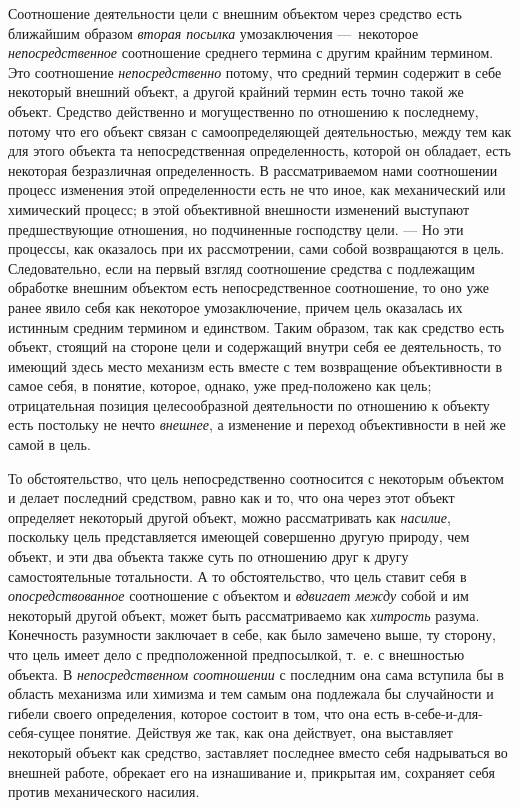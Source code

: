\documentclass[twoside]{article}
\begin{document}
{{{{Соотношение деятельности цели с внешним объектом через
средство есть ближайшим образом
{\em вторая посылка}
умозаключения —~некоторое
{\em непосредственное}
соотношение среднего термина с другим крайним термином. Это
соотношение {\em непосредственно}
потому, что средний термин содержит в себе некоторый внешний
объект, а другой крайний термин есть точно такой же объект. Средство
действенно и могущественно по отношению к последнему, потому что его объект
связан с самоопределяющей деятельностью, между тем как для этого объекта та
непосредственная определенность, которой он обладает, есть некоторая
безразличная определенность. В рассматриваемом нами соотношении процесс
изменения этой определенности есть не что иное, как механический или
химический процесс; в этой объективной внешности изменений выступают
предшествующие отношения, но подчиненные господству цели. —
Но эти процессы, как оказалось при их рассмотрении, сами
собой возвращаются в цель. Следовательно, если на первый взгляд соотношение
средства с подлежащим обработке внешним объектом есть непосредственное
соотношение, то оно уже ранее явило себя как некоторое умозаключение,
причем цель оказалась их истинным средним термином и единством. Таким
образом, так как средство есть объект, стоящий на стороне цели и содержащий
внутри себя ее деятельность, то имеющий здесь место механизм есть вместе с
тем возвращение объективности в самое себя, в понятие, которое, однако, уже
пред-положено как цель; отрицательная позиция целесообразной деятельности
по отношению к объекту есть постольку не нечто
{\em внешнее}, а
изменение и переход объективности в ней же самой в цель.

То обстоятельство, что цель непосредственно соотносится с
некоторым объектом и делает последний средством, равно как и то, что она
через этот объект определяет некоторый другой объект, можно рассматривать
как {\em насилие},
поскольку цель представляется имеющей совершенно другую
природу, чем объект, и эти два объекта также суть по отношению друг к другу
самостоятельные тотальности. А то обстоятельство, что цель ставит себя в
{\em опосредствованное}
соотношение с объектом и
{\em вдвигает между}
собой и им некоторый другой объект, может быть рассматриваемо
как {\em хитрость}
разума. Конечность разумности заключает в себе, как было
замечено выше, ту сторону, что цель имеет дело с
предположенной предпосылкой, т.~е. с внешностью объекта. В
{\em непосредственном соотношении}
с последним она сама вступила бы в область механизма или
химизма и тем самым она подлежала бы случайности и гибели своего
определения, которое состоит в том, что она есть в-себе-и-для-себя-сущее
понятие. Действуя же так, как она действует, она выставляет некоторый
объект как средство, заставляет последнее вместо себя надрываться во
внешней работе, обрекает его на изнашивание и, прикрытая им, сохраняет себя
против механического насилия.

}}}}
\end{document}
